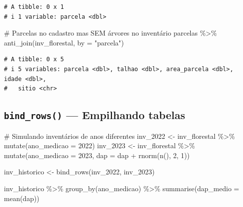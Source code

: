 \documentclass[
  letterpaper,
]{scrbook}
\newenvironment{Shaded}{\begin{snugshade}}{\end{snugshade}}
\newcommand{\AttributeTok}[1]{\textcolor[rgb]{0.40,0.45,0.13}{#1}}
\newcommand{\CommentTok}[1]{\textcolor[rgb]{0.37,0.37,0.37}{#1}}
\newcommand{\DecValTok}[1]{\textcolor[rgb]{0.68,0.00,0.00}{#1}}
\newcommand{\FunctionTok}[1]{\textcolor[rgb]{0.28,0.35,0.67}{#1}}
\newcommand{\NormalTok}[1]{\textcolor[rgb]{0.00,0.23,0.31}{#1}}
\newcommand{\OtherTok}[1]{\textcolor[rgb]{0.00,0.23,0.31}{#1}}
\newcommand{\SpecialCharTok}[1]{\textcolor[rgb]{0.37,0.37,0.37}{#1}}
\newcommand{\StringTok}[1]{\textcolor[rgb]{0.13,0.47,0.30}{#1}}
\begin{document}
\begin{verbatim}
# A tibble: 0 x 1
# i 1 variable: parcela <dbl>
\end{verbatim}

\begin{Shaded}
\begin{Highlighting}[]
\CommentTok{\# Parcelas no cadastro mas SEM árvores no inventário}
\NormalTok{parcelas }\SpecialCharTok{\%\textgreater{}\%} 
  \FunctionTok{anti\_join}\NormalTok{(inv\_florestal, }\AttributeTok{by =} \StringTok{"parcela"}\NormalTok{)}
\end{Highlighting}
\end{Shaded}

\begin{verbatim}
# A tibble: 0 x 5
# i 5 variables: parcela <dbl>, talhao <dbl>, area_parcela <dbl>, idade <dbl>,
#   sitio <chr>
\end{verbatim}

\subsection{\texorpdfstring{\texttt{bind\_rows()} --- Empilhando
tabelas}{bind\_rows() --- Empilhando tabelas}}\label{bind_rows-empilhando-tabelas}

\begin{Shaded}
\begin{Highlighting}[]
\CommentTok{\# Simulando inventários de anos diferentes}
\NormalTok{inv\_2022 }\OtherTok{\textless{}{-}}\NormalTok{ inv\_florestal }\SpecialCharTok{\%\textgreater{}\%} \FunctionTok{mutate}\NormalTok{(}\AttributeTok{ano\_medicao =} \DecValTok{2022}\NormalTok{)}
\NormalTok{inv\_2023 }\OtherTok{\textless{}{-}}\NormalTok{ inv\_florestal }\SpecialCharTok{\%\textgreater{}\%} \FunctionTok{mutate}\NormalTok{(}\AttributeTok{ano\_medicao =} \DecValTok{2023}\NormalTok{, }\AttributeTok{dap =}\NormalTok{ dap }\SpecialCharTok{+} \FunctionTok{rnorm}\NormalTok{(}\FunctionTok{n}\NormalTok{(), }\DecValTok{2}\NormalTok{, }\DecValTok{1}\NormalTok{))}

\NormalTok{inv\_historico }\OtherTok{\textless{}{-}} \FunctionTok{bind\_rows}\NormalTok{(inv\_2022, inv\_2023)}

\NormalTok{inv\_historico }\SpecialCharTok{\%\textgreater{}\%} 
  \FunctionTok{group\_by}\NormalTok{(ano\_medicao) }\SpecialCharTok{\%\textgreater{}\%} 
  \FunctionTok{summarise}\NormalTok{(}\AttributeTok{dap\_medio =} \FunctionTok{mean}\NormalTok{(dap))}
\end{Highlighting}
\end{Shaded}
\end{document}
